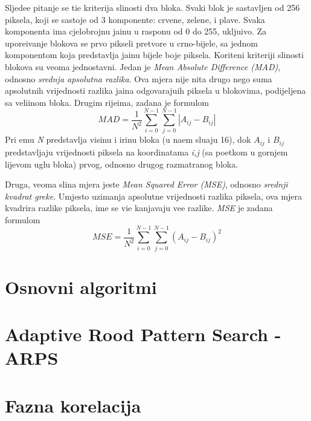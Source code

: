 Sljede\cj e pitanje se ti\ch e kriterija sli\ch nosti dva bloka. Svaki blok je sastavljen od 256 piksela, koji se sastoje od 3 komponente: crvene, zelene, i plave. Svaka komponenta ima cjelobrojnu ja\ch inu u rasponu od 0 do 255, uklju\ch ivo.
Za upore\dj ivanje blokova se prvo pikseli pretvore u crno-bijele, sa jednom komponentom koja predstavlja ja\ch inu bijele boje piksela.
Kori\sh teni kriteriji sli\ch nosti blokova su veoma jednostavni. Jedan je  \textit{Mean Absolute Difference (MAD)}, odnosno \textit{srednja apsolutna razlika}. Ova mjera nije ni\sh ta drugo nego suma apsolutnih vrijednosti razlika
ja\ch ina odgovaraju\cj ih piksela u blokovima, podijeljena sa veli\ch inom bloka. Drugim rije\ch ima, zadana je formulom
$$
MAD = \frac{1}{N^2}\sum_{i=0}^{N-1}\sum_{j=0}^{N-1}|A_{ij}-B_{ij}|
$$
Pri \ch emu \textit{N} predstavlja visinu i \sh irinu bloka (u na\sh em slu\ch aju 16), dok $A_{ij}$ i $B_{ij}$ predstavljaju vrijednosti piksela na koordinatama \textit{i,j} (sa po\ch etkom u gornjem lijevom uglu bloka) prvog,
odnosno drugog razmatranog bloka. 

Druga, veoma sli\ch na mjera jeste \textit{Mean Squared Error (MSE)}, odnosno \textit{srednji kvadrat gre\sh ke}. Umjesto uzimanja apsolutne vrijednosti razlika piksela, ova mjera kvadrira razlike piksela, \ch ime se vi\sh e
ka\zh njavaju ve\cj e razlike. \textit{MSE} je zadana formulom
$$
MSE = \frac{1}{N^2}\sum_{i=0}^{N-1}\sum_{j=0}^{N-1}(A_{ij}-B_{ij})^2
$$

\section{Osnovni algoritmi}

\section{Adaptive Rood Pattern Search - ARPS}

\section{Fazna korelacija}